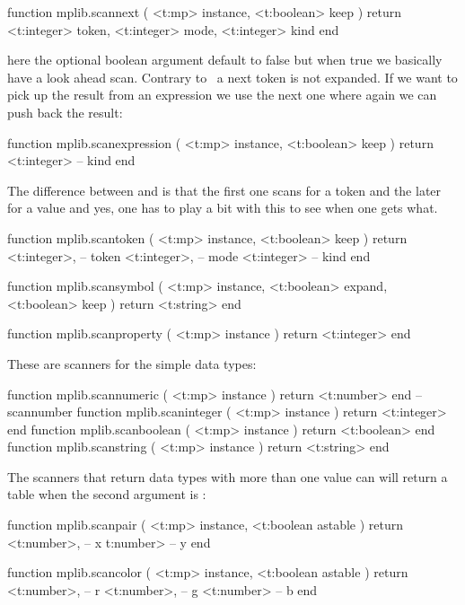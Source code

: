 \starttyping[option=LUA]
function mplib.scannext ( <t:mp> instance, <t:boolean> keep )
    return <t:integer> token, <t:integer> mode, <t:integer> kind
end
\stoptyping

here the optional  boolean argument default to false but when true we
basically have a look ahead scan. Contrary to \TEX\ a next token is not expanded. If we
want to pick up the result from an expression we use the next one where again we can
push back the result:

\startfourrows
\stopfourrows

\starttyping[option=LUA]
function mplib.scanexpression ( <t:mp> instance, <t:boolean> keep )
    return <t:integer> -- kind
end
\stoptyping

The difference between  and  is that the first one
scans for a token and the later for a value and yes, one has to play a bit with
this to see when one gets what.

\starttyping[option=LUA]
function mplib.scantoken ( <t:mp> instance, <t:boolean> keep )
    return
        <t:integer>, -- token
        <t:integer>, -- mode
        <t:integer>  -- kind
end
\stoptyping

\starttyping[option=LUA]
function mplib.scansymbol ( <t:mp> instance, <t:boolean> expand, <t:boolean> keep )
    return <t:string>
end
\stoptyping

\starttyping[option=LUA]
function mplib.scanproperty ( <t:mp> instance )
    return <t:integer>
end
\stoptyping

These are scanners for the simple data types:

\starttyping[option=LUA]
function mplib.scannumeric ( <t:mp> instance ) return <t:number>  end -- scannumber
function mplib.scaninteger ( <t:mp> instance ) return <t:integer> end
function mplib.scanboolean ( <t:mp> instance ) return <t:boolean> end
function mplib.scanstring  ( <t:mp> instance ) return <t:string>  end
\stoptyping

The scanners that return data types with more than one value can will return a
table when the second argument is :

\starttyping[option=LUA]
function mplib.scanpair ( <t:mp> instance, <t:boolean astable )
    return
        <t:number>, -- x
        t:number>   -- y
end
\stoptyping

\starttyping[option=LUA]
function mplib.scancolor (
    <t:mp>      instance,
    <t:boolean astable
)
    return
        <t:number>, -- r
        <t:number>, -- g
        <t:number>  -- b
end
\stoptyping

